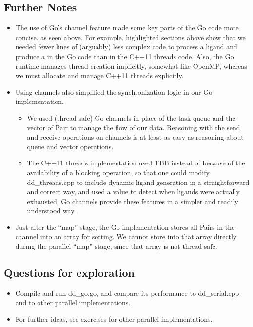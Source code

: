 \documentclass[letterpaper,10pt,openany,oneside]{sphinxmanual}
\begin{document}
\subsection{Further Notes}
\label{go/go:further-notes}\begin{itemize}
\item {} 
The use of Go’s channel feature made some key parts of the Go code more concise, as seen above. For example, highlighted sections above show that we needed fewer lines of (arguably) less complex code to process a ligand and produce a  in the Go code than in the C++11 threads code. Also, the Go runtime manages thread creation implicitly, somewhat like OpenMP, whereas we must allocate and manage C++11 threads explicitly.

\item {} 
Using channels also simplified the synchronization logic in our Go implementation.
\begin{itemize}
\item {} 
We used (thread-safe) Go channels in place of the task queue  and the vector of Pair  to manage the flow of our data. Reasoning with the send and receive operations on channels is at least as easy as reasoning about queue and vector operations.

\item {} 
The C++11 threads implementation used TBB  instead of  because of the availability of a blocking  operation, so that one could modify dd\_threads.cpp to include dynamic ligand generation in a straightforward and correct way, and used a value  to detect when ligands were actually exhausted. Go channels provide these features in a simpler and readily understood way.

\end{itemize}

\item {} 
Just after the “map” stage, the Go implementation stores all Pairs in the channel  into an array for sorting. We cannot store into that array directly during the parallel “map” stage, since that array is not thread-safe.

\end{itemize}


\subsection{Questions for exploration}
\label{go/go:questions-for-exploration}\begin{itemize}
\item {} 
Compile and run dd\_go.go, and compare its performance to dd\_serial.cpp and to other parallel implementations.

\item {} 
For further ideas, see exercises for other parallel implementations.

\end{itemize}
\end{document}
